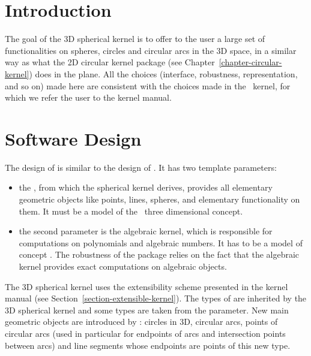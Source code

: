 \section{Introduction}

The goal of the 3D spherical kernel is to offer to the user a large set
of functionalities on spheres, circles and circular arcs in the 3D
space, in a similar way as what the 2D circular kernel package (see
Chapter~\ref{chapter-circular-kernel}) does in the plane. All the
choices (interface, robustness, representation, and so on) made here
are consistent with the choices made in the \cgal\ kernel, for which
we refer the user to the kernel manual.

\section{Software Design}

The design of  is similar to the design of
. It has two template parameters:
\begin{itemize}
\item {} the , from which the spherical kernel derives,
provides all elementary geometric objects like points, lines, spheres, and
elementary functionality on them. It must be a model of the \cgal\ three 
dimensional  concept.
\item {} the second parameter is the algebraic kernel, which is 
responsible for computations on polynomials and algebraic numbers. It 
has to be a model of concept . The
robustness of the package relies on the fact that the algebraic kernel
provides exact computations on algebraic objects.
\end{itemize}

The 3D spherical kernel uses the extensibility scheme presented in the 
kernel manual (see Section~\ref{section-extensible-kernel}). 
The types of  are inherited
by the 3D spherical kernel and some types are taken from the
 parameter. New main geometric objects are
introduced by : circles in 3D, circular arcs,
points of circular arcs (used in particular for endpoints of arcs and
intersection points between arcs) and line segments whose endpoints
are points of this new type.


